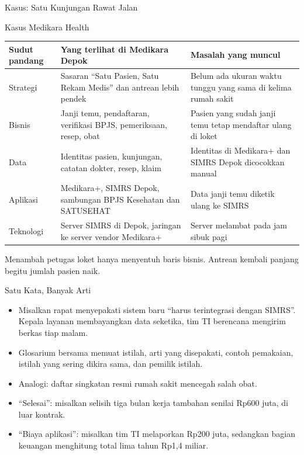 \documentclass[aspectratio=169, table, 12pt]{beamer}
\begin{document}
\begin{frame}{{\Large Kasus: Satu Kunjungan Rawat Jalan}}
  \begin{block}{Kasus Medikara Health}
    \scriptsize
    \begin{tabularx}{\linewidth}{>{\raggedright\arraybackslash}p{1.5cm}
        >{\raggedright\arraybackslash}X >{\raggedright\arraybackslash}X}
      \hline
      \textbf{Sudut pandang} & \textbf{Yang terlihat di Medikara Depok} & \textbf{Masalah yang muncul} \\
      \hline
      Strategi & Sasaran ``Satu Pasien, Satu Rekam Medis'' dan antrean lebih pendek & Belum ada ukuran waktu tunggu yang sama di kelima rumah sakit \\
      \hline
      Bisnis & Janji temu, pendaftaran, verifikasi BPJS, pemeriksaan, resep, obat & Pasien yang sudah janji temu tetap mendaftar ulang di loket \\
      \hline
      Data & Identitas pasien, kunjungan, catatan dokter, resep, klaim & Identitas di Medikara+ dan SIMRS Depok dicocokkan manual \\
      \hline
      Aplikasi & Medikara+, SIMRS Depok, sambungan BPJS Kesehatan dan SATUSEHAT & Data janji temu diketik ulang ke SIMRS \\
      \hline
      Teknologi & Server SIMRS di Depok, jaringan ke server vendor Medikara+ & Server melambat pada jam sibuk pagi \\
      \hline
    \end{tabularx}

    \vspace{4pt}
    Menambah petugas loket hanya menyentuh baris bisnis. Antrean kembali panjang begitu jumlah
    pasien naik.
  \end{block}
\end{frame}

\begin{frame}{{\Large Satu Kata, Banyak Arti}}
  \vspace{6pt}
  \small
  \begin{itemize}
    \item Misalkan rapat menyepakati sistem baru ``harus terintegrasi dengan SIMRS''. Kepala layanan
          membayangkan data seketika, tim TI berencana mengirim berkas tiap malam.
    \item Glosarium bersama memuat istilah, arti yang disepakati, contoh pemakaian, istilah yang
          sering dikira sama, dan pemilik istilah.
    \item Analogi: daftar singkatan resmi rumah sakit mencegah salah obat.
    \item ``Selesai'': misalkan selisih tiga bulan kerja tambahan senilai Rp600 juta, di luar kontrak.
    \item ``Biaya aplikasi'': misalkan tim TI melaporkan Rp200 juta, sedangkan bagian keuangan
          menghitung total lima tahun Rp1,4 miliar.
  \end{itemize}
\end{frame}
\end{document}
